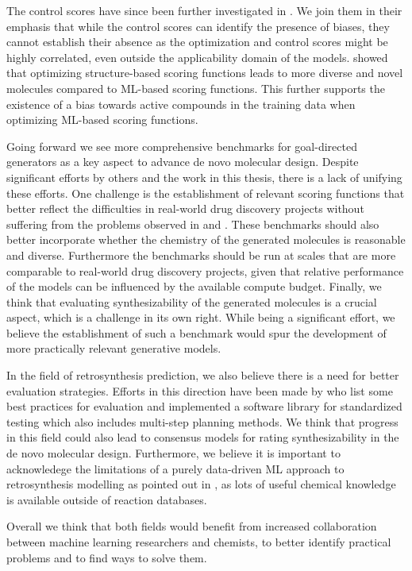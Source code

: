 The control scores have since been further investigated in \citep{turkMolecularAssaysSimulator2022}.
We join them in their emphasis that while the control scores can identify the presence of biases,
they cannot establish their absence as the optimization and control scores might be highly
correlated, even outside the applicability domain of the models.
\citet{thomasComparisonStructureLigandbased2021} showed that optimizing structure-based scoring
functions leads to more diverse and novel molecules compared to \ac{ML}-based scoring functions.
This further supports the existence of a bias towards active compounds in the training data when
optimizing \ac{ML}-based scoring functions.

Going forward we see more comprehensive benchmarks for goal-directed generators as a key aspect to
advance de novo molecular design. Despite significant efforts by others
\citep{brownGuacaMolBenchmarkingModels2019,gaoSampleEfficiencyMatters2022,gaoSynthesizabilityMoleculesProposed2020,thomasMolScoreScoringEvaluation2024}
and the work in this thesis, there is a lack of unifying these efforts. One challenge is the
establishment of relevant scoring functions that better reflect the difficulties in real-world drug
discovery projects \citep{fromerComputeraidedMultiobjectiveOptimization2023} without suffering from
the problems observed in  and \citep{lyuModelingExpansionVirtual2023}. These
benchmarks should also better incorporate whether the chemistry of the generated molecules is
reasonable \citep{thomasReevaluatingSampleEfficiency2022} and diverse. Furthermore the benchmarks
should be run at scales that are more comparable to real-world drug discovery projects, given that
relative performance of the models can be influenced by the available compute budget. Finally, we
think that evaluating synthesizability of the generated molecules is a crucial aspect, which is a
challenge in its own right. While being a significant effort, we believe the establishment of such a
benchmark would spur the development of more practically relevant generative models.

In the field of retrosynthesis prediction, we also believe there is a need for better evaluation
strategies. Efforts in this direction have been made by
\citet{maziarzReevaluatingRetrosynthesisAlgorithms2024a} who list some best practices for evaluation
and implemented a software library for standardized testing which also includes multi-step planning
methods. We think that progress in this field could also lead to consensus models for rating
synthesizability in the de novo molecular design. Furthermore, we believe it is important to
acknowledege the limitations of a purely data-driven ML approach to retrosynthesis modelling as
pointed out in \citep{strieth-kalthoffArtificialIntelligenceRetrosynthetic2024}, as lots of useful
chemical knowledge is available outside of reaction databases.

Overall we think that both fields would benefit from increased collaboration between machine
learning researchers and chemists, to better identify practical problems
\citep{benderArtificialIntelligenceDrug2021} and to find ways to solve them.


